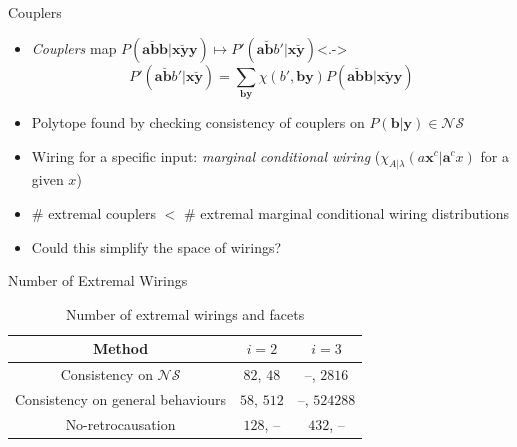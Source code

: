 \documentclass[xcolor=dvipsnames]{beamer}
\newenvironment{Tabular}[1] %
{\def\arraystretch{1.75}\begin{tabular}{#1}}
{\end{tabular}}
\newcommand{\?}{\mathrel{?}} %
\newcommand{\cvec}[1]{\boldsymbol{\mathbf{#1}}}    %
\newcommand{\NSs}{\mathcal{NS}}
\begin{document}
\begin{frame}{Couplers}
  \begin{itemize}[<+->]
    \item \emph{Couplers} map \(P(\cvec{a\breve{b}b}|\cvec{x\breve{y}y}) \mapsto P'(\cvec{a\breve{b}}b'|\cvec{x\breve{y}})\)\only<.->{}
    \[ P'(\cvec{a\breve{b}}b'|\cvec{x\breve{y}}) = \sum_{\cvec{by}} \chi(b',\cvec{by})P(\cvec{a\breve{b}b}|\cvec{x\breve{y}y}) \]
    \item Polytope found by checking consistency of couplers on \(P(\cvec{b}|\cvec{y}) \in \NSs\)
    \item Wiring for a specific input: \emph{marginal conditional wiring} (\(\chi_{A|\lambda}(a\cvec{x}^c|\cvec{a}^cx)\) for a given \(x\))
    \item \(\#\) extremal couplers \(<\) \(\#\) extremal marginal conditional wiring distributions
    \item Could this simplify the space of wirings?
  \end{itemize}
\end{frame}

\begin{frame}{Number of Extremal Wirings}
  \begin{table}
    \begin{Tabular}{ccc} 
      \toprule
      Method & \(i = 2\) & \(i = 3\) \\
      \midrule
      Consistency on \(\NSs\) & \(82\), \(48\)  & --, \(2816\) \\
      Consistency on general behaviours & \(58\), \(512\) & --, \(524288\) \\
      No-retrocausation & \(128\), -- & \(432\), -- \\
      \bottomrule
    \end{Tabular}
    \caption{Number of extremal wirings and facets}
  \end{table}
\end{frame}
\end{document}
